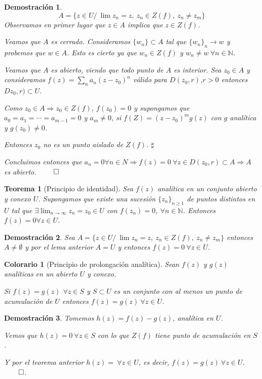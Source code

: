 \documentclass[12pt]{book}
\newtheorem{theorem}{Teorema}[chapter]
\newtheorem*{dem}{Demostración}
\newtheorem{col}{Colorario}[chapter]
\newcommand{\N}{\mathbb{N}}
\begin{document}
\begin{dem}
$$A = \{z\in U /\ \lim z_n = z,\ z_n\in Z(f),\ z_n\neq z_m\}$$
Observamos en primer lugar que $z\in A$ implica que $z\in Z(f)$.

Veamos que $A$ es cerrado. Consideramos $\{w_n\}\subset A$ tal que $\{w_n\}_n\to w$ y probemos que $w \in A$. Esto es cierto ya que $w_n\in Z(f)$ y $w_n\neq w\ \forall n\in\N$.

Veamos que $A$ es abierto, viendo que todo punto de $A$ es interior. Sea $z_0\in A$ y consideramos $f(z) = \sum_n a_n (z-z_0)^n$ válido para $D(z_0,r)$,$r>0$ entonces $Dz_0,r)\subset U$.

Como $z_0 \in A \Rightarrow z_0\in Z(f),\ f(z_0) = 0$ y supongamos que $a_0 = a_1 = \cdots=a_{m-1} = 0$ y $ a_m\neq 0$, si $f(Z) = (z-z_0)^m g(z)$ con $g$ analítica y $g(z_0)\neq 0$.

Entonces $z_0$ no es un punto aislado de $Z(f)$. $\sharp$

Concluimos entonces que $a_n = 0 \forall n\in N\Rightarrow f(z)=0\ \forall z \in  D(z_0,r)\subset A \Rightarrow A$ es abierto. $\qed$
\end{dem}


\begin{theorem}[Principio de identidad]
Sea $f(z)$ analítica en un conjunto abierto y conexo $U$. Supongamos que  existe una sucesión $\{z_n\}_{n\geq 1}$ de puntos distintos en $U$ tal que $\exists \lim_{n\to \infty}z_n = z_0 \in U$ con $f(z_n)=0$, $\forall n \in \N$.  Entonces $f(z) =0 \forall z \in U$.
\end{theorem}

\begin{dem}
Sea $A = \{z\in U /\ \lim z_n = z,\ z_n\in Z(f),\ z_n\neq z_m\}$ entonces $A\neq \emptyset$ y por el lema anterior $A = U$ y entonces $f(z) = 0\ \forall z\in U$.
\end{dem}


\begin{col}[Principio de prolongación analítica]
Sean $f(z)$ y $g(z)$ analíticas en un abierto $U$ y conexo.

Si $f(z) = g(z)$ $\forall z\in S$ y $S\subset U$ es un conjunto con al menos un punto de acumulación de $U$ entonces $f(z) = g(z)\ \forall z\in U$.
\end{col}

\begin{dem}
Tomemos $h(z) = f(z)-g(z)$, analítica en $U$.

Vemos que $h(z) = 0\ \forall z \in S$ con lo que $Z(f)$ tiene punto de acumulación en $S$.

Y por el teorema anterior $h(z)= \ \forall z\in U$, es decir, $f(z) = g(z) \ \forall z \in U$. $\qed$.
\end{dem}
\end{document}
